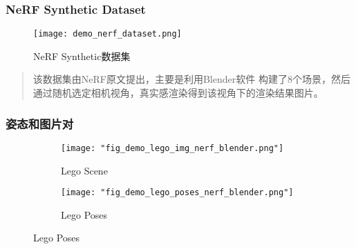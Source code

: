 \begin{frame}
\frametitle{NeRF Synthetic Dataset}
\begin{figure}[H]
    \texttt{[image: demo\_nerf\_dataset.png]}
    \caption[short]{NeRF Synthetic数据集}
\end{figure}
\begin{quote}
    该数据集由NeRF原文提出，主要是利用Blender软件
    构建了8个场景，然后通过随机选定相机视角，真实感渲染得到该视角下的渲染结果图片。
\end{quote}
\end{frame}

\begin{frame}
\frametitle{姿态和图片对}
\begin{figure}
    \centering
        \begin{subfigure}{0.48\linewidth}
            \texttt{[image: "fig\_demo\_lego\_img\_nerf\_blender.png"]}
            \caption{Lego Scene}
        \end{subfigure}
        \begin{subfigure}{0.48\linewidth}
            \texttt{[image: "fig\_demo\_lego\_poses\_nerf\_blender.png"]}
            \caption{Lego Poses}
        \end{subfigure}
\end{figure}
\end{frame}